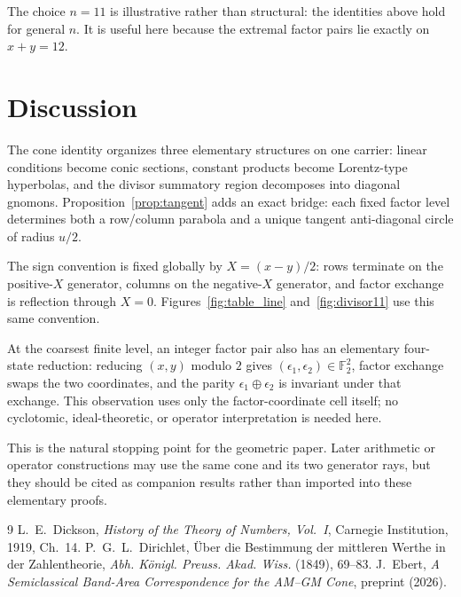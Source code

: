 \documentclass[11pt]{amsart}
\theoremstyle{remark}
\begin{document}
The choice $n=11$ is illustrative rather than structural: the identities above hold for general $n$. It is useful here because the extremal factor pairs lie exactly on $x+y=12$.

\section{Discussion}
The cone identity organizes three elementary structures on one carrier: linear conditions become conic sections, constant products become Lorentz-type hyperbolas, and the divisor summatory region decomposes into diagonal gnomons. Proposition~\ref{prop:tangent} adds an exact bridge: each fixed factor level determines both a row/column parabola and a unique tangent anti-diagonal circle of radius $u/2$.

The sign convention is fixed globally by $X=(x-y)/2$: rows terminate on the positive-$X$ generator, columns on the negative-$X$ generator, and factor exchange is reflection through $X=0$. Figures~\ref{fig:table_line} and~\ref{fig:divisor11} use this same convention.

At the coarsest finite level, an integer factor pair also has an elementary four-state reduction: reducing $(x,y)$ modulo $2$ gives $(\epsilon_1,\epsilon_2)\in\mathbb F_2^2$, factor exchange swaps the two coordinates, and the parity $\epsilon_1\oplus\epsilon_2$ is invariant under that exchange. This observation uses only the factor-coordinate cell itself; no cyclotomic, ideal-theoretic, or operator interpretation is needed here.

This is the natural stopping point for the geometric paper. Later arithmetic or operator constructions may use the same cone and its two generator rays, but they should be cited as companion results rather than imported into these elementary proofs.

\begin{thebibliography}{9}
 L.~E.~Dickson, \emph{History of the Theory of Numbers, Vol.~I}, Carnegie Institution, 1919, Ch.~14.
 P.~G.~L.~Dirichlet, \"Uber die Bestimmung der mittleren Werthe in der Zahlentheorie, \emph{Abh. K\"onigl. Preuss. Akad. Wiss.} (1849), 69--83.
 J.~Ebert, \emph{A Semiclassical Band-Area Correspondence for the AM--GM Cone}, preprint (2026).
\end{thebibliography}
\end{document}
